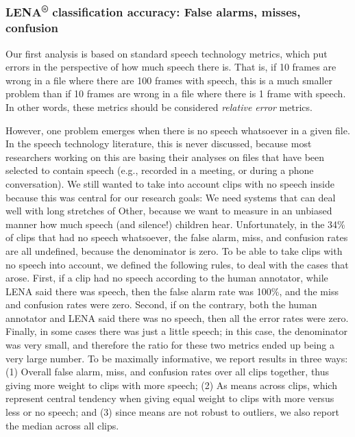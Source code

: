 \documentclass[english,table,man,floatsintext]{apa6}
\begin{document}
\subsubsection{\texorpdfstring{LENA\textsuperscript{®} classification
accuracy: False alarms, misses,
confusion}{LENA® classification accuracy: False alarms, misses, confusion}}\label{lena-classification-accuracy-false-alarms-misses-confusion}

Our first analysis is based on standard speech technology metrics, which
put errors in the perspective of how much speech there is. That is, if
10 frames are wrong in a file where there are 100 frames with speech,
this is a much smaller problem than if 10 frames are wrong in a file
where there is 1 frame with speech. In other words, these metrics should
be considered \emph{relative error} metrics.

However, one problem emerges when there is no speech whatsoever in a
given file. In the speech technology literature, this is never
discussed, because most researchers working on this are basing their
analyses on files that have been selected to contain speech (e.g.,
recorded in a meeting, or during a phone conversation). We still wanted
to take into account clips with no speech inside because this was
central for our research goals: We need systems that can deal well with
long stretches of Other, because we want to measure in an unbiased
manner how much speech (and silence!) children hear. Unfortunately, in
the 34\% of clips that had no speech whatsoever, the false alarm, miss,
and confusion rates are all undefined, because the denominator is zero.
To be able to take clips with no speech into account, we defined the
following rules, to deal with the cases that arose. First, if a clip had
no speech according to the human annotator, while LENA said there was
speech, then the false alarm rate was 100\%, and the miss and confusion
rates were zero. Second, if on the contrary, both the human annotator
and LENA said there was no speech, then all the error rates were zero.
Finally, in some cases there was just a little speech; in this case, the
denominator was very small, and therefore the ratio for these two
metrics ended up being a very large number. To be maximally informative,
we report results in three ways: (1) Overall false alarm, miss, and
confusion rates over all clips together, thus giving more weight to
clips with more speech; (2) As means across clips, which represent
central tendency when giving equal weight to clips with more versus less
or no speech; and (3) since means are not robust to outliers, we also
report the median across all clips.
\end{document}
